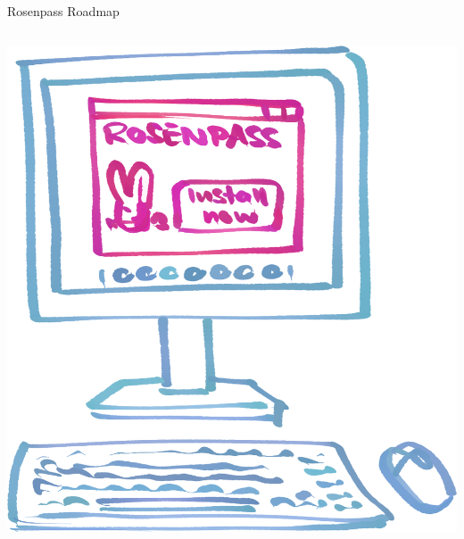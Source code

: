 \documentclass{rosenpass-beamer}
\begin{document}
\begin{frame}{Rosenpass Roadmap}
\begin{columns}[c]
\begin{column}{0.2\textwidth}
\medskip
\includegraphics[width=\linewidth]{graphics/Illu-install.png}

\end{column}
\end{columns}
\end{frame}
\end{document}
